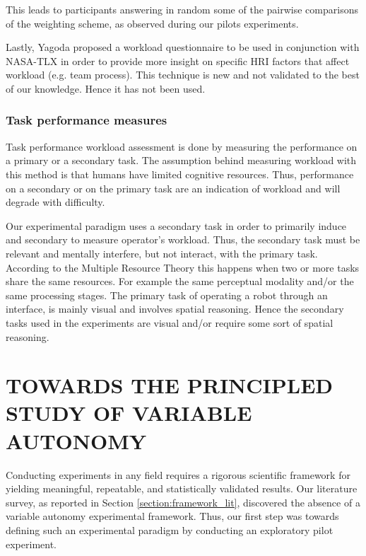 \documentclass[a4paper,12pt,oneside,openright]{bhamthesis}
\begin{document}
This leads to participants answering in random some of the pairwise comparisons of the weighting scheme, as observed during our pilots experiments.

Lastly, Yagoda \cite{Yagoda2010} proposed a workload questionnaire to be used in conjunction with NASA-TLX in order to provide more insight on specific HRI factors that affect workload (e.g. team process). This technique is new and not validated to the best of our knowledge. Hence it has not been used. 

\subsection{Task performance measures}
Task performance workload assessment is done by measuring the performance on a primary or a secondary task. The assumption behind measuring workload with this method is that humans have limited cognitive resources. Thus, performance on a secondary or on the primary task are an indication of workload and will degrade with difficulty.

Our experimental paradigm uses a secondary task in order to primarily induce and secondary to measure operator's workload. Thus, the secondary task must be relevant and mentally interfere, but not interact, with the primary task. According to the Multiple Resource Theory \cite{Wickens2008,Wickens2002} this happens when two or more tasks share the same resources. For example the same perceptual modality and/or the same processing stages. The primary task of operating a robot through an interface, is mainly visual and involves spatial reasoning. Hence the secondary tasks used in the experiments are visual and/or require some sort of spatial reasoning. 


\chapter{TOWARDS THE PRINCIPLED STUDY OF VARIABLE AUTONOMY}\label{chapter3:towards}

Conducting experiments in any field requires a rigorous scientific framework for yielding meaningful, repeatable, and statistically validated results. Our literature survey, as reported in Section \ref{section:framework_lit}, discovered the absence of a variable autonomy experimental framework. Thus, our first step was towards defining such an experimental paradigm by conducting an exploratory pilot experiment.
\end{document}
